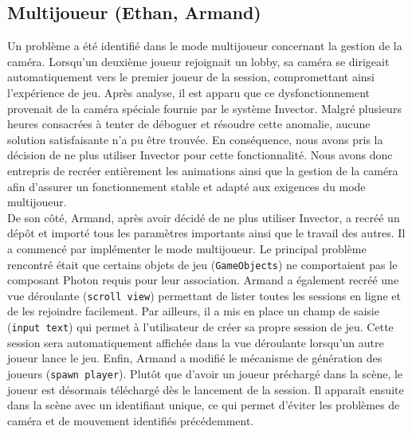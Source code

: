 \documentclass{report}
\begin{document}
\subsection*{Multijoueur (Ethan, Armand)}
Un problème a été identifié dans le mode multijoueur concernant la gestion de la caméra. Lorsqu'un deuxième joueur rejoignait un lobby, sa caméra se dirigeait automatiquement vers le premier joueur de la session, compromettant ainsi l'expérience de jeu. Après analyse, il est apparu que ce dysfonctionnement provenait de la caméra spéciale fournie par le système Invector. Malgré plusieurs heures consacrées à tenter de déboguer et résoudre cette anomalie, aucune solution satisfaisante n'a pu être trouvée. En conséquence, nous avons pris la décision de ne plus utiliser Invector pour cette fonctionnalité. Nous avons donc entrepris de recréer entièrement les animations ainsi que la gestion de la caméra afin d'assurer un fonctionnement stable et adapté aux exigences du mode multijoueur.
\\[0.4cm]
De son côté, Armand, après avoir décidé de ne plus utiliser Invector, a recréé un dépôt et importé tous les paramètres importants ainsi que le travail des autres. Il a commencé par implémenter le mode multijoueur. Le principal problème rencontré était que certains objets de jeu (\texttt{GameObjects}) ne comportaient pas le composant Photon requis pour leur association. Armand a également recréé une vue déroulante (\texttt{scroll view}) permettant de lister toutes les sessions en ligne et de les rejoindre facilement. Par ailleurs, il a mis en place un champ de saisie (\texttt{input text}) qui permet à l’utilisateur de créer sa propre session de jeu. Cette session sera automatiquement affichée dans la vue déroulante lorsqu’un autre joueur lance le jeu. Enfin, Armand a modifié le mécanisme de génération des joueurs (\texttt{spawn player}). Plutôt que d’avoir un joueur préchargé dans la scène, le joueur est désormais téléchargé dès le lancement de la session. Il apparaît ensuite dans la scène avec un identifiant unique, ce qui permet d’éviter les problèmes de caméra et de mouvement identifiés précédemment.
\newpage
\end{document}
